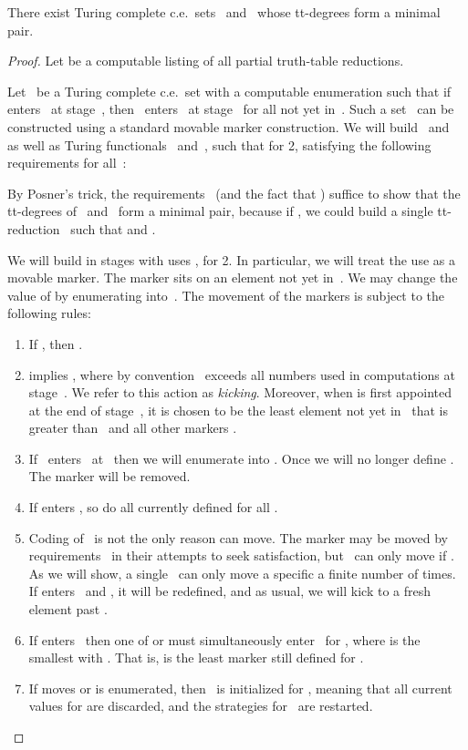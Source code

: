 \documentclass{LMCS}
\newcommand{\0}{\mathbf{0}}
\newcommand{\ce}{c.e.\ }
\newcommand{\<}{\langle}
\renewcommand{\>}{\rangle}
\begin{document}
\begin{thm}\label{minpairthm}
There exist Turing complete c.e.\ sets~ and~ whose tt-degrees form a
minimal pair.
\end{thm}

\begin{proof}
Let  be a computable listing of all partial
truth-table reductions.

Let~ be a Turing complete \ce set with a computable enumeration
 such that if~ enters~ at stage~, then~
enters~ at stage~ for all  not yet in~.  Such a set~
can be constructed using a standard movable marker construction.
We will build~ and~ as well as Turing functionals~
and~, such that  for  2, satisfying the
following requirements for all~:

By Posner's trick, the requirements~ (and the fact
that ) suffice to show that the tt-degrees of~ and~
form a minimal pair, because if , we could
build a single tt-reduction~ such that 
and .

We will build  in stages with uses , for
 2.  In particular, we will treat the use  as a movable
marker.  The marker  sits on an element not yet in~.  We
may change the value of  by enumerating 
into~.  The movement of the markers is subject to the following rules:

\begin{enumerate}
\item If , then .
\item  implies ,
    where by convention~ exceeds all numbers used in computations at
    stage~. We refer to this action as \emph{kicking}. Moreover, when
     is first appointed at the end of stage~, it is
    chosen to be the least element not yet in~ that is greater
    than~ and all other markers .
\item If~ enters~ at~ then we will  enumerate 
    into .
Once  we will no longer define .  The marker
will be removed.
\item If  enters , so do all currently defined
     for all .
\item Coding of~ is not the only reason  can move. The
    marker  may be moved by requirements~ in
    their attempts to seek satisfaction, but~ can only move
     if . As we will show, a single~
    can only move a specific  a finite number of times. If
      enters~ and , it will be
    redefined, and as usual, we will kick  to a fresh
    element past .
\item If  enters~ then one of  or
     must simultaneously enter~ for , where
     is the smallest  with .  That is,
     is the least marker still defined for .
\item If  moves or is enumerated, then~ is
    initialized for , meaning that all current values for 
    are discarded, and the strategies for~ are restarted.
\end{enumerate}


\end{proof}
\end{document}
